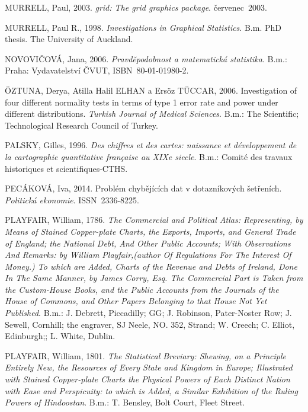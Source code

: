 \documentclass[12pt,]{article}
\begin{document}
\hypertarget{ref-murrell2003}{}
MURRELL, Paul, 2003. \emph{grid: The grid graphics package}.
červenec~2003.

\hypertarget{ref-murrell1998}{}
MURRELL, Paul R., 1998. \emph{Investigations in Graphical Statistics}.
B.m. PhD thesis. The University of Auckland.

\hypertarget{ref-novovic2006}{}
NOVOVIČOVÁ, Jana, 2006. \emph{Pravděpodobnost a matematická statistika}.
B.m.: Praha: Vydavatelství ČVUT, ISBN~80-01-01980-2.

\hypertarget{ref-normality_tests}{}
ÖZTUNA, Derya, Atilla Halil ELHAN a Ersöz TÜCCAR, 2006. Investigation of
four different normality tests in terms of type 1 error rate and power
under different distributions. \emph{Turkish Journal of Medical
Sciences}. B.m.: The Scientific; Technological Research Council of
Turkey.

\hypertarget{ref-palsky1996}{}
PALSKY, Gilles, 1996. \emph{Des chiffres et des cartes: naissance et
développement de la cartographie quantitative française au XIXe siecle}.
B.m.: Comité des travaux historiques et scientifiques-CTHS.

\hypertarget{ref-pecakova}{}
PECÁKOVÁ, Iva, 2014. Problém chybějících dat v dotazníkových šetřeních.
\emph{Politická ekonomie}. ISSN~2336-8225.

\hypertarget{ref-playfair1786}{}
PLAYFAIR, William, 1786. \emph{The Commercial and Political Atlas:
Representing, by Means of Stained Copper-plate Charts, the Exports,
Imports, and General Trade of England; the National Debt, And Other
Public Accounts; With Observations And Remarks: by William
Playfair,(author Of Regulations For The Interest Of Money.) To which are
Added, Charts of the Revenue and Debts of Ireland, Done In The Same
Manner, by James Corry, Esq. The Commercial Part is Taken from the
Custom-House Books, and the Public Accounts from the Journals of the
House of Commons, and Other Papers Belonging to that House Not Yet
Published}. B.m.: J. Debrett, Piccadilly; GG; J. Robinson, Pater-Noster
Row; J. Sewell, Cornhill; the engraver, SJ Neele, NO. 352, Strand; W.
Creech; C. Elliot, Edinburgh;; L. White, Dublin.

\hypertarget{ref-playfair1801}{}
PLAYFAIR, William, 1801. \emph{The Statistical Breviary: Shewing, on a
Principle Entirely New, the Resources of Every State and Kingdom in
Europe; Illustrated with Stained Copper-plate Charts the Physical Powers
of Each Distinct Nation with Ease and Perspicuity: to which is Added, a
Similar Exhibition of the Ruling Powers of Hindoostan}. B.m.: T.
Bensley, Bolt Court, Fleet Street.
\end{document}
